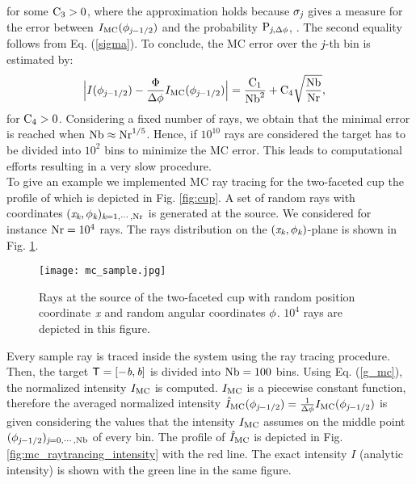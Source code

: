 for some $\textrm{C}_3>0$, where the approximation holds because $\sigma_{\textit{j}}$ gives a measure for the error between 
$I_{\textrm{MC}}(\phi_{\textit{j}-1/2})$ and the probability $\textrm{P}_{\textit{j}, \Delta\phi}$, \cite{diez2012openintro}. The second equality follows from Eq. (\ref{sigma}). To conclude, the MC error over the $\textit{j}$-th bin is estimated by:
\begin{equation} \begin{aligned}
\Big|I(\phi_{\textit{j}-1/2})&-\frac{\Phi}
{\Delta\phi}I_{\textrm{MC}}(\phi_{\textit{j}-1/2})\Big| =
\frac{\textrm{C}_1}{\textrm{Nb}^2} + \textrm{C}_4\sqrt{\frac{\textrm{Nb}}{\textrm{Nr}}},
\end{aligned}
\end{equation}
for $\textrm{C}_4>0$.
Considering a fixed number of rays, we obtain that the minimal error is reached when $\textrm{Nb}\approx \textrm{Nr}^{1/5}$.
Hence, if $10^{10}$ rays are considered the target has to be divided into $10^2$ bins to minimize the MC error.
This leads to computational efforts resulting in a very slow procedure.\\ \indent
To give an example we implemented MC ray tracing for the two-faceted cup the profile of which is depicted in Fig. \ref{fig:cup}.
A set of random rays with coordinates $(\textit{x}_{\textit{k}}, \phi_{\textit{k}})_{\textit{k}= 1, \cdots, \textrm{Nr}}$ is generated at the source. We considered for instance $\textrm{Nr}=10^4$ rays. The rays distribution on the $(\textit{x}_{\textit{k}}, \phi_{\textit{k}})$-plane is shown in Fig. \ref{fig:mc_sample}.
\begin{figure}[h]
\begin{center}
    \texttt{[image: mc\_sample.jpg]}
    \caption{Rays at the source of the two-faceted cup with random position coordinate $\textit{x}$ and random angular coordinates $\phi$. $10^4$ rays are depicted in this figure.}
    \label{fig:mc_sample}
\end{center}
  \end{figure}
Every sample ray is traced inside the system using the ray tracing procedure. Then, the target $\textsf{T} = [-\textit{b}, \textit{b}]$ is divided into $\textrm{Nb}= 100$ bins. 
Using Eq. (\ref{g_mc}), the normalized intensity $I_{\textrm{MC}}$ is computed. $I_{\textrm{MC}}$  is a piecewise constant function, therefore the averaged normalized intensity  $\hat{I}_{\textrm{MC}}(\phi_{\textit{j}-1/2})= \frac{1}{\Delta \phi}I_{\textrm{MC}}(\phi_{\textit{j}-1/2})$ is given considering the values that the intensity  $I_{\textrm{MC}}$ assumes on the middle point $(\phi_{\textit{j}-1/2})_{\textit{j} = 0, \cdots, \textrm{Nb}}$ of every bin. The profile of $\hat{I}_{\textrm{MC}}$ is depicted in Fig. \ref{fig:mc_raytrancing_intensity} with the red line. The exact intensity $I$ (analytic intensity) is shown with the green line in the same figure.
